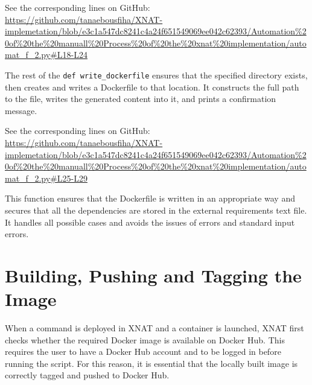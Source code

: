 \noindent\footnotesize See the corresponding lines on GitHub:\url{ https://github.com/tanaebousfiha/XNAT-implemetation/blob/e3c1a547dc8241c4a24f651549069ee042c62393/Automation%20of%20the%20manuall%20Process%20of%20the%20xnat%20implementation/automat_f_2.py#L18-L24}

















The rest of the \texttt{def write\_dockerfile} ensures that the specified directory exists, then creates and writes a Dockerfile to that location. It constructs the full path to the file, writes the generated content into it, and prints a confirmation message.






\noindent\footnotesize See the corresponding lines on GitHub:\url{ https://github.com/tanaebousfiha/XNAT-implemetation/blob/e3c1a547dc8241c4a24f651549069ee042c62393/Automation%20of%20the%20manuall%20Process%20of%20the%20xnat%20implementation/automat_f_2.py#L25-L29}







This function ensures that the Dockerfile is written in an appropriate way and secures that all the dependencies are stored in the external requirements text file. It handles all possible cases and avoids the issues of errors and standard input errors.

\section{Building, Pushing and Tagging the Image}

When a command is deployed in XNAT and a container is launched, XNAT first checks whether the required Docker image is available on Docker Hub. This requires the user to have a Docker Hub account and to be logged in before running the script. For this reason, it is essential that the locally built image is correctly tagged and pushed to Docker Hub.

